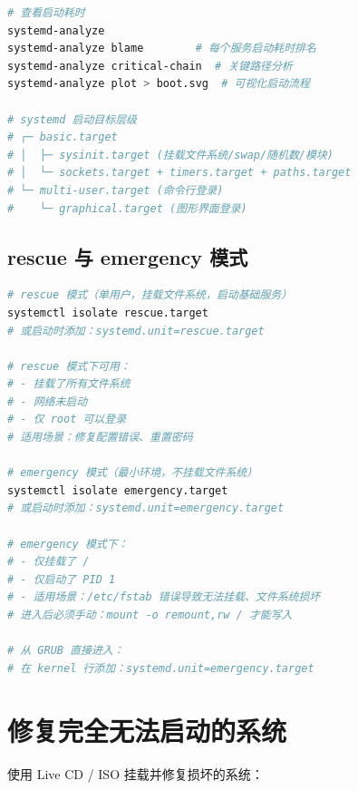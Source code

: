 \documentclass[12pt,UTF8]{ctexbook}
\begin{document}
\begin{lstlisting}[language=bash]
# 查看启动耗时
systemd-analyze
systemd-analyze blame        # 每个服务启动耗时排名
systemd-analyze critical-chain  # 关键路径分析
systemd-analyze plot > boot.svg  # 可视化启动流程

# systemd 启动目标层级
# ┌─ basic.target
# │  ├─ sysinit.target (挂载文件系统/swap/随机数/模块)
# │  └─ sockets.target + timers.target + paths.target
# └─ multi-user.target (命令行登录)
#    └─ graphical.target (图形界面登录)
\end{lstlisting}

\subsection{rescue 与 emergency 模式}

\begin{lstlisting}[language=bash]
# rescue 模式（单用户，挂载文件系统，启动基础服务）
systemctl isolate rescue.target
# 或启动时添加：systemd.unit=rescue.target

# rescue 模式下可用：
# - 挂载了所有文件系统
# - 网络未启动
# - 仅 root 可以登录
# 适用场景：修复配置错误、重置密码

# emergency 模式（最小环境，不挂载文件系统）
systemctl isolate emergency.target
# 或启动时添加：systemd.unit=emergency.target

# emergency 模式下：
# - 仅挂载了 /
# - 仅启动了 PID 1
# - 适用场景：/etc/fstab 错误导致无法挂载、文件系统损坏
# 进入后必须手动：mount -o remount,rw / 才能写入

# 从 GRUB 直接进入：
# 在 kernel 行添加：systemd.unit=emergency.target
\end{lstlisting}

\section{修复完全无法启动的系统}
\label{sec:system-rescue}

使用 Live CD / ISO 挂载并修复损坏的系统：
\end{document}
